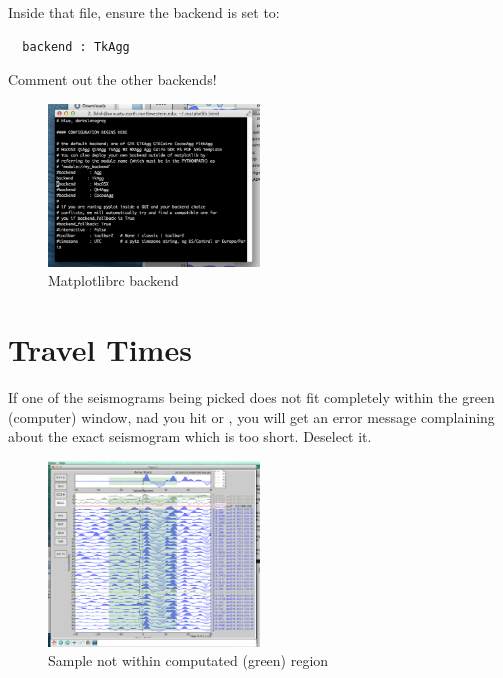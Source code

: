 \documentclass[letterpaper,10pt]{article}
\begin{document}
Inside that file, ensure the backend is set to:

\begin{verbatim}
  backend : TkAgg
\end{verbatim}

Comment out the other backends! 

\begin{figure}[h!]
  \centering
  \includegraphics[width=0.5\textwidth]{images/matplotlibrc_file}
  \caption{Matplotlibrc backend}
  \label{fig:matplotlibrc_file}
\end{figure}



\section{Travel Times}

If one of the seismograms being picked does not fit completely within the green (computer) window, nad you hit  or , you will get an error message complaining about the exact seismogram which is too short. Deselect it. 

\begin{figure}[h!]
  \centering
  \includegraphics[width=0.5\textwidth]{images/not_enough_sample}
  \caption{Sample not within computated (green) region}
  \label{fig:not_enough_sample}
\end{figure}
\end{document}
